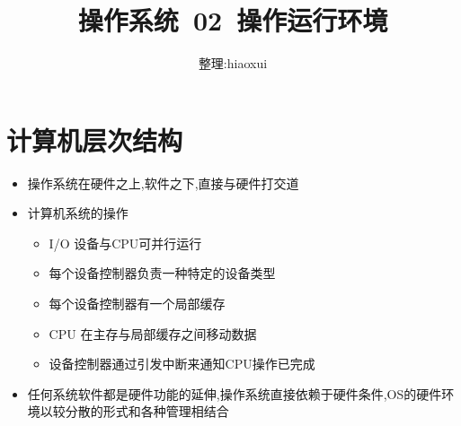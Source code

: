 \documentclass[a4paper,12pt,notitlepage]{article}
\begin{document}
\title{操作系统\ 02\ 操作运行环境}
\author{整理:hiaoxui}
\maketitle

\section{计算机层次结构}

\begin{itemize}
	\item 操作系统在硬件之上,软件之下,直接与硬件打交道
	\item 计算机系统的操作
	\begin{itemize}
		\item I/O 设备与CPU可并行运行
		\item 每个设备控制器负责一种特定的设备类型
		\item 每个设备控制器有一个局部缓存
		\item CPU 在主存与局部缓存之间移动数据
		\item 设备控制器通过引发中断来通知CPU操作已完成
	\end{itemize}
	\item 任何系统软件都是硬件功能的延伸,操作系统直接依赖于硬件条件,OS的硬件环境以较分散的形式和各种管理相结合
\end{itemize}
\end{document}
